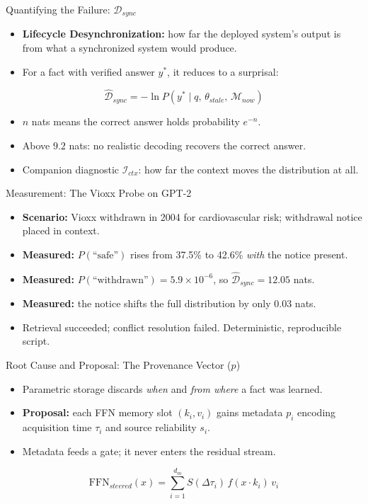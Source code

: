\documentclass{beamer}
\begin{document}
\begin{frame}{Quantifying the Failure: $\mathcal{D}_{sync}$}
  \begin{itemize}
    \item \textbf{Lifecycle Desynchronization:} how far the deployed system's output is from what a synchronized system would produce.
    \item For a fact with verified answer $y^*$, it reduces to a surprisal:
  \end{itemize}
  \begin{equation*}
    \widehat{\mathcal{D}}_{sync} = -\ln P\!\left(y^* \mid q,\, \theta_{stale},\, \mathcal{M}_{now}\right)
  \end{equation*}
  \begin{itemize}
    \item $n$ nats means the correct answer holds probability $e^{-n}$.
    \item Above $9.2$ nats: no realistic decoding recovers the correct answer.
    \item Companion diagnostic $\mathcal{I}_{ctx}$: how far the context moves the distribution at all.
  \end{itemize}
\end{frame}

\begin{frame}{Measurement: The Vioxx Probe on GPT-2}
  \begin{itemize}
    \item \textbf{Scenario:} Vioxx withdrawn in 2004 for cardiovascular risk; withdrawal notice placed in context.
    \item \textbf{Measured:} $P(\text{``safe''})$ rises from 37.5\% to 42.6\% \textit{with} the notice present.
    \item \textbf{Measured:} $P(\text{``withdrawn''}) = 5.9 \times 10^{-6}$, so $\widehat{\mathcal{D}}_{sync} = 12.05$ nats.
    \item \textbf{Measured:} the notice shifts the full distribution by only $0.03$ nats.
    \item Retrieval succeeded; conflict resolution failed. Deterministic, reproducible script.
  \end{itemize}
\end{frame}

\begin{frame}{Root Cause and Proposal: The Provenance Vector ($p$)}
  \begin{itemize}
    \item Parametric storage discards \textit{when} and \textit{from where} a fact was learned.
    \item \textbf{Proposal:} each FFN memory slot $(k_i, v_i)$ gains metadata $p_i$ encoding acquisition time $\tau_i$ and source reliability $s_i$.
    \item Metadata feeds a gate; it never enters the residual stream.
  \end{itemize}
  \begin{equation*}
    \text{FFN}_{steered}(x) = \sum_{i=1}^{d_m} S(\Delta\tau_i)\, f(x \cdot k_i)\, v_i
  \end{equation*}
\end{frame}
\end{document}
